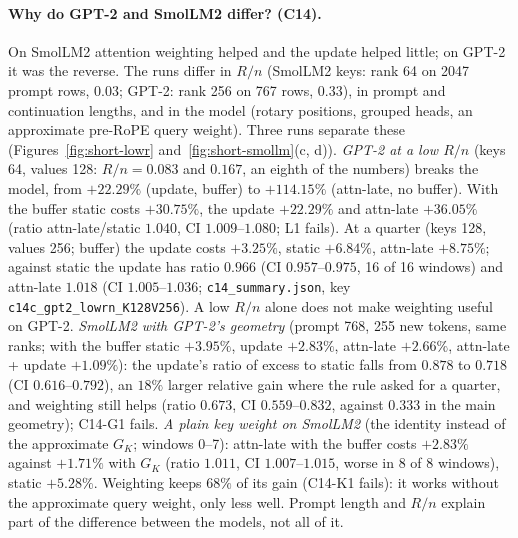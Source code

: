 \documentclass[10pt]{article}
\theoremstyle{plain}
\theoremstyle{definition}
\theoremstyle{remark}
\newcommand{\rl}[1]{\textsf{#1}}%
\begin{document}
\paragraph{Why do GPT-2 and SmolLM2 differ? (C14).} On SmolLM2 attention weighting helped and the update helped little; on GPT-2 it was the reverse. The runs differ in $R/n$ (SmolLM2 keys: rank 64 on 2047 prompt rows, $0.03$; GPT-2: rank 256 on 767 rows, $0.33$), in prompt and continuation lengths, and in the model (rotary positions, grouped heads, an approximate pre-RoPE query weight). Three runs separate these (Figures~\ref{fig:short-lowr} and~\ref{fig:short-smollm}(c, d)). \emph{GPT-2 at a low $R/n$} (keys 64, values 128: $R/n=0.083$ and $0.167$, an eighth of the numbers) breaks the model, from $+22.29\%$ (update, buffer) to $+114.15\%$ (attn-late, no buffer). With the buffer static costs $+30.75\%$, the update $+22.29\%$ and attn-late $+36.05\%$ (ratio attn-late/static $1.040$, CI $1.009$--$1.080$; \rl{L1} fails). At a quarter (keys 128, values 256; buffer) the update costs $+3.25\%$, static $+6.84\%$, attn-late $+8.75\%$; against static the update has ratio $0.966$ (CI $0.957$--$0.975$, 16 of 16 windows) and attn-late $1.018$ (CI $1.005$--$1.036$; \texttt{c14\_summary.json}, key \texttt{c14c\_gpt2\_lowrn\_K128V256}). A low $R/n$ alone does not make weighting useful on GPT-2. \emph{SmolLM2 with GPT-2's geometry} (prompt 768, 255 new tokens, same ranks; with the buffer static $+3.95\%$, update $+2.83\%$, attn-late $+2.66\%$, attn-late + update $+1.09\%$): the update's ratio of excess to static falls from $0.878$ to $0.718$ (CI $0.616$--$0.792$), an $18\%$ larger relative gain where the rule asked for a quarter, and weighting still helps (ratio $0.673$, CI $0.559$--$0.832$, against $0.333$ in the main geometry); \rl{C14-G1} fails. \emph{A plain key weight on SmolLM2} (the identity instead of the approximate $G_K$; windows 0--7): attn-late with the buffer costs $+2.83\%$ against $+1.71\%$ with $G_K$ (ratio $1.011$, CI $1.007$--$1.015$, worse in 8 of 8 windows), static $+5.28\%$. Weighting keeps $68\%$ of its gain (\rl{C14-K1} fails): it works without the approximate query weight, only less well. Prompt length and $R/n$ explain part of the difference between the models, not all of it.
\end{document}
